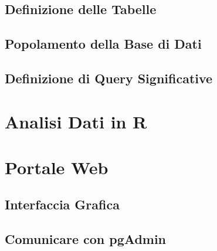 \documentclass{article}
\begin{document}
\subsection{Definizione delle Tabelle}
\subsection{Popolamento della Base di Dati}
\subsection{Definizione di Query Significative}




\clearpage
\section{Analisi Dati in R}




\clearpage
\section{Portale Web}
\subsection{Interfaccia Grafica}
\subsection{Comunicare con pgAdmin}
\end{document}
